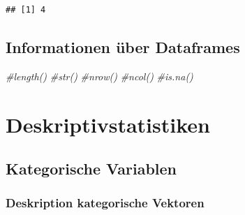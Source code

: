 \documentclass[
]{book}
\newenvironment{Shaded}{\begin{snugshade}}{\end{snugshade}}
\newcommand{\CommentTok}[1]{\textcolor[rgb]{0.56,0.35,0.01}{\textit{#1}}}
\begin{document}
\begin{verbatim}
## [1] 4
\end{verbatim}

\hypertarget{informationen-uxfcber-dataframes}{%
\subsection{Informationen über Dataframes}\label{informationen-uxfcber-dataframes}}

\begin{Shaded}
\begin{Highlighting}[]
\CommentTok{\#length()}
\CommentTok{\#str()}
\CommentTok{\#nrow()}
\CommentTok{\#ncol()}
\CommentTok{\#is.na()}
\end{Highlighting}
\end{Shaded}

\hypertarget{deskriptivstatistiken}{%
\section{Deskriptivstatistiken}\label{deskriptivstatistiken}}

\hypertarget{kategorische-variablen}{%
\subsection{Kategorische Variablen}\label{kategorische-variablen}}

\hypertarget{deskription-kategorische-vektoren}{%
\subsubsection{Deskription kategorische Vektoren}\label{deskription-kategorische-vektoren}}
\end{document}

